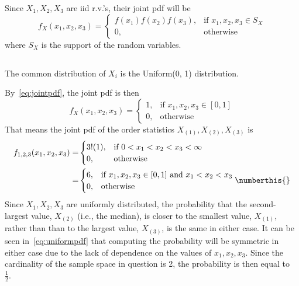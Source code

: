 \documentclass[hwnumber=3]{mthe353answer}
\begin{document}
  \begin{questions}
    \setcounter{question}{2}
    \question{}
    \begin{note}
      Since \(X_1, X_2, X_3\) are iid r.v.'s, their joint pdf will be
      \begin{equation}
        \label{eq:jointpdf}
        f_X(x_1,x_2, x_3) =
        \begin{cases}
          f(x_1)f(x_2)f(x_3), & \text{if } x_1, x_2, x_3 \in S_X\\
          0, & \text{otherwise}
        \end{cases}
      \end{equation}
      where \(S_X\) is the support of the random variables.
    \end{note}
    \begin{parts}
      \part{}
      The common distribution of \(X_i\) is the Uniform(0, 1) distribution.
      \begin{solution}
        By~\eqref{eq:jointpdf}, the joint pdf is then
        \begin{equation*}
          f_X(x_1, x_2, x_3) =
          \begin{cases}
            1, & \text{if } x_1, x_2, x_3 \in [0, 1]\\
            0, & \text{otherwise}
          \end{cases}
        \end{equation*}
        That means the joint pdf of the order statistics \(X_{(1)}, X_{(2)},
        X_{(3)}\) is
        \begin{align*}
          f_{1, 2, 3}(x_1, x_2, x_3) =&
          \begin{cases}
            3!(1), & \text{if } 0 < x_1 < x_2 < x_3 < \infty\\
            0, & \text{otherwise}
          \end{cases}\\
          =&
          \begin{cases}
            6, & \text{if } x_1, x_2, x_3 \in [0, 1] \text{ and } x_1 < x_2 < x_3\\
            0, & \text{otherwise}
          \end{cases} \label{eq:uniformpdf} \numberthis{}
        \end{align*}
        Since \(X_1, X_2, X_3\) are uniformly distributed, the probability that
        the second-largest value, \(X_{(2)}\) (i.e., the median), is closer to the smallest
        value, \(X_{(1)}\), rather than than to the largest value, \(X_{(3)}\),
        is the same in either case. It can be seen in~\eqref{eq:uniformpdf} that
        computing the probability will be symmetric in either case due to the lack
        of dependence on the values of \(x_1, x_2, x_3\). Since the cardinality
        of the sample space in question is 2, the probability is then equal to~
        \(\boxed{\frac{1}{2}}\).
      \end{solution}

\end{parts}
\end{questions}
\end{document}
